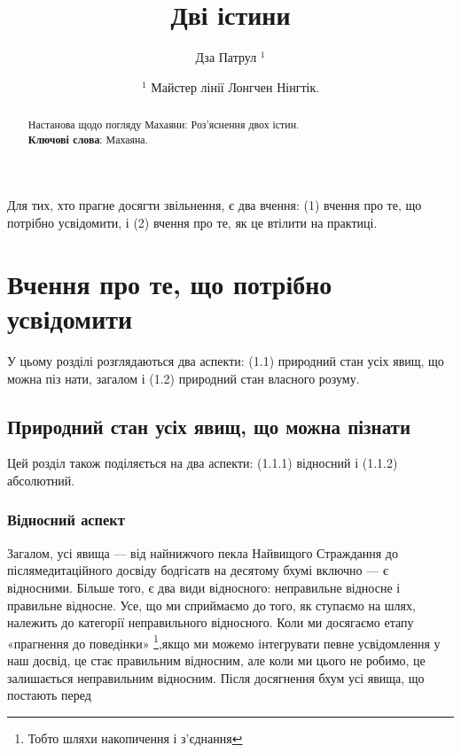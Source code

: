 \documentclass{article}
\begin{document}
\title{Дві істини}
\author{Дза Патрул $^1$}
\date{ $^1$ Майстер лінії Лонгчен Нінгтік. }

\maketitle

\begin{abstract}Настанова щодо погляду Махаяни: Роз’яснення двох істин. \\
\textbf{Ключові слова}: Махаяна.
\end{abstract}

\tableofcontents

\vspace{1cm}

Для тих, хто прагне досягти звільнення, є два вчення: (1) вчення про те, що потрібно усвідомити, і (2) вчення про те, як це втілити на практиці.

\section{Вчення про те, що потрібно усвідомити}

У цьому розділі розглядаються два аспекти: (1.1) природний стан усіх явищ, що можна піз нати, загалом і (1.2) природний стан власного розуму.

\subsection{Природний стан усіх явищ, що можна пізнати}

Цей розділ також поділяється на два аспекти: (1.1.1) відносний і (1.1.2) абсолютний.

\subsubsection{Відносний аспект}
Загалом, усі явища — від найнижчого пекла Найвищого Страждання до післямедитаційного досвіду бодгісатв на десятому бхумі включно — є відносними. Більше того, є два види відносного: неправильне відносне і правильне відносне. Усе, що ми сприймаємо до того, як ступаємо на шлях, належить до категорії неправильного відносного. Коли ми досягаємо етапу «прагнення до поведінки»
\footnote{Тобто шляхи накопичення і з'єднання},якщо ми можемо інтегрувати певне усвідомлення у наш досвід, це стає правильним відносним, але коли ми цього не робимо, це залишається неправильним відносним. Після досягнення бхум усі явища, що постають перед
\end{document}
